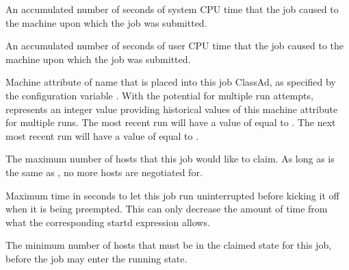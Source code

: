 \begin{description}
\item[\AdAttr{LocalSysCpu}:]  An accumulated number of seconds of 
system CPU time that the job caused to the machine upon which
the job was submitted.

\item[\AdAttr{LocalUserCpu}:]  An accumulated number of seconds of 
user CPU time that the job caused to the machine upon which
the job was submitted.

\item[\AdAttr{MachineAttr<X><N>}:] 
Machine attribute of name  that is placed into this job ClassAd,
as specified by the configuration variable
.
With the potential for multiple run attempts,  represents
an integer value providing historical values of this machine attribute
for multiple runs.
The most recent run will have a value of  equal to .
The next most recent run will have a value of  equal to .

\item[\AdAttr{MaxHosts}:]  The maximum number of hosts that this job would
like to claim. As long as  is the same as
, no more hosts are negotiated for.

\item[\AdAttr{MaxJobRetirementTime}:]  Maximum time in seconds to let this
job run uninterrupted before kicking it off when it is being preempted.
This can only decrease the amount of time from what the corresponding
startd expression allows.

\item[\AdAttr{MinHosts}:]  The minimum number of hosts that must be in
the claimed state for this job, before the job may enter the running state.


\end{description}
